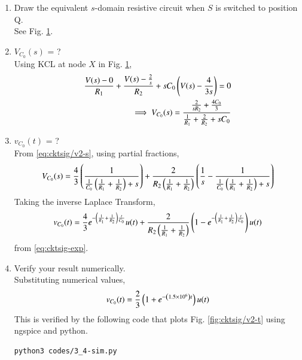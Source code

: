 \documentclass[journal,12pt,twocolumn]{IEEEtran}
\renewcommand\thesection{\arabic{section}}
\begin{document}
\begin{enumerate}[label=\arabic*.,ref=\thesection.\theenumi]
\item Draw the equivalent $s$-domain resistive circuit when $S$ 
is switched to position Q. 
\\
See Fig. 
\ref{fig:cktsig/sckt-q2-s}.
\begin{figure}[!htb]
	\centering
	
\caption{}
\label{fig:cktsig/sckt-q2-s}
\end{figure}
\item $V_{C_0}(s)$ = ?  
\\
\solution Using KCL at node $X$ in Fig.
\ref{fig:cktsig/sckt-q2-s},
\begin{align}
	\frac{V(s) - 0}{R_1} + \frac{V(s) - \frac{2}{s}}{R_2} + sC_0\brak{V(s) - \frac{4}{3s}} = 0 \\
\implies V_{C_0}(s) = \frac{\frac{2}{sR_2} + \frac{4C_0}{3}}{\frac{1}{R_1} + \frac{2}{R_2} + sC_0}
\label{eq:cktsig/v2-s}
\end{align}
\item $v_{C_0}(t)$ = ? 
\\
\solution From \eqref{eq:cktsig/v2-s}, using partial fractions, 
\begin{align}
    V_{C_0}(s) = \frac{4}{3}\left(\frac{1}{\frac{1}{C_0}\left(\frac{1}{R_1} + \frac{1}{R_2}\right)+s}\right) 
    + \frac{2}{R_2\left(\frac{1}{R_1} +\frac{1}{R_2}\right)}\left(\frac{1}{s} - \frac{1}{\frac{1}{C_0}\left(\frac{1}{R_1} + \frac{1}{R_2}\right) + s}\right)
\end{align}
Taking the inverse Laplace Transform,
\begin{align}
    v_{C_0}(t) = \frac{4}{3}e^{-\left(\frac{1}{R_1} + \frac{1}{R_2}\right)\frac{t}{C_0}}u(t)  
    + \frac{2}{R_2\left(\frac{1}{R_1}+\frac{1}{R_2}\right)}\left(1 - e^{-\left(\frac{1}{R_1} + \frac{1}{R_2}\right)\frac{t}{C_0}}\right)u(t)
\end{align}
			from \eqref{eq:cktsig-exp}.
		\item Verify your result numerically.
			\\
			\solution
Substituting numerical values, 
\begin{align}
    v_{C_0}(t) = \frac{2}{3}\brak{1 +e^{-\brak{1.5 \times 10^6}t}}u(t)
    \label{eq:cktsig/v2-t}
\end{align}
This is verified by the following  code that plots 
Fig.
    \ref{fig:cktsig/v2-t} using ngspice and python.
\begin{lstlisting}
python3 codes/3_4-sim.py
\end{lstlisting}
\begin{figure}[!htb]
	\centering

\end{figure}
\end{enumerate}
\end{document}
